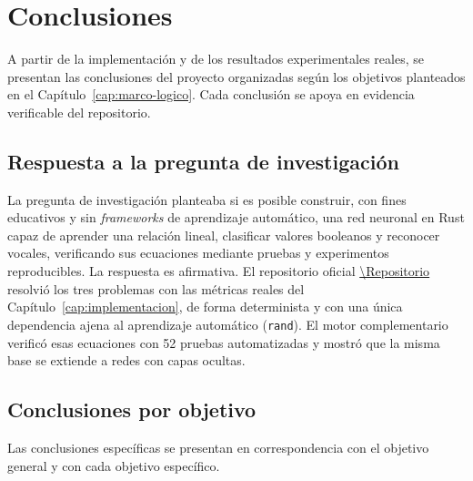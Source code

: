 \chapter{Conclusiones}\label{cap:conclusiones}
A partir de la implementación y de los resultados experimentales reales, se presentan las conclusiones del proyecto organizadas según los objetivos planteados en el Capítulo~\ref{cap:marco-logico}. Cada conclusión se apoya en evidencia verificable del repositorio.

\section{Respuesta a la pregunta de investigación}
La pregunta de investigación planteaba si es posible construir, con fines educativos y sin \emph{frameworks} de aprendizaje automático, una red neuronal en Rust capaz de aprender una relación lineal, clasificar valores booleanos y reconocer vocales, verificando sus ecuaciones mediante pruebas y experimentos reproducibles. La respuesta es afirmativa. El repositorio oficial \url{\Repositorio} resolvió los tres problemas con las métricas reales del Capítulo~\ref{cap:implementacion}, de forma determinista y con una única dependencia ajena al aprendizaje automático (\texttt{rand}). El motor complementario verificó esas ecuaciones con 52 pruebas automatizadas y mostró que la misma base se extiende a redes con capas ocultas.

\section{Conclusiones por objetivo}
Las conclusiones específicas se presentan en correspondencia con el objetivo general y con cada objetivo específico.

